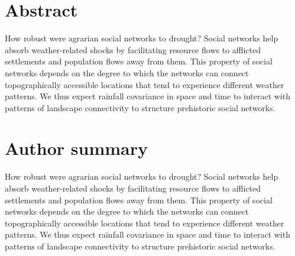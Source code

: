 \documentclass[10pt,letterpaper]{article}
\date{}
\newcommand{\getIndex}[2]{
  \ForEach{,}{\IfEq{#1}{\thislevelitem}{\number\thislevelcount\ExitForEach}{}}{#2}
}
\newcommand{\getAff}[1]{
  \getIndex{#1}{Arizona State University}
}
\begin{document}
\vspace*{0.2in}

\section*{Abstract}
How robust were agrarian social networks to drought? Social networks
help absorb weather-related shocks by facilitating resource flows to
afflicted settlements and population flows away from them. This property
of social networks depends on the degree to which the networks can
connect topographically accessible locations that tend to experience
different weather patterns. We thus expect rainfall covariance in space
and time to interact with patterns of landscape connectivity to
structure prehistoric social networks.

\section*{Author summary}
How robust were agrarian social networks to drought? Social networks
help absorb weather-related shocks by facilitating resource flows to
afflicted settlements and population flows away from them. This property
of social networks depends on the degree to which the networks can
connect topographically accessible locations that tend to experience
different weather patterns. We thus expect rainfall covariance in space
and time to interact with patterns of landscape connectivity to
structure prehistoric social networks.
\end{document}
